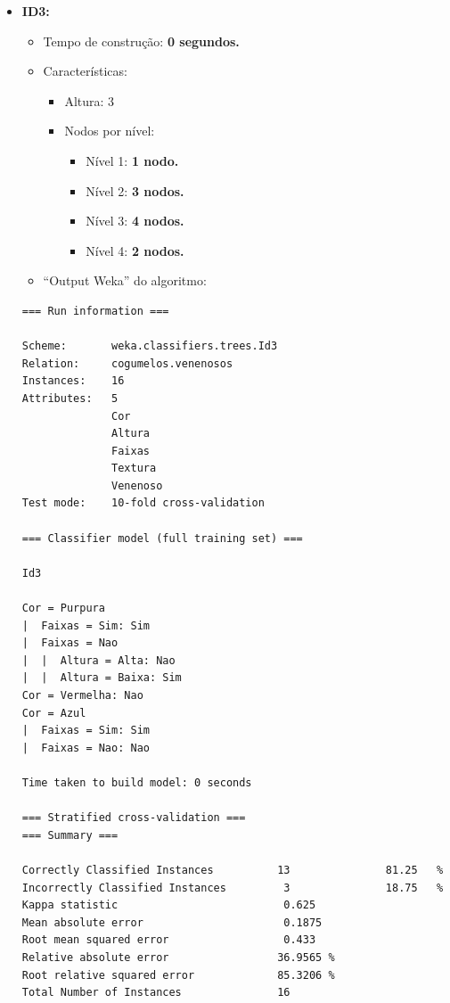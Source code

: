 \documentclass[
    article,            %
    11pt,               %
    oneside,            %
    a4paper,            %
    english,            %
    brazil,             %
    sumario=tradicional,
    ]{abntex2}
\begin{document}
\begin{itemize}
    \item \textbf{ID3:}
    \begin{itemize}
        \item Tempo de construção: \textbf{0 segundos.}
        \item Características:
        \begin{itemize}
            \item Altura: 3
            \item Nodos por nível:
                \begin{itemize}
                    \item Nível 1: \textbf{1 nodo.}
                    \item Nível 2: \textbf{3 nodos.}
                    \item Nível 3: \textbf{4 nodos.}
                    \item Nível 4: \textbf{2 nodos.}
                \end{itemize}
        \end{itemize}
        \item ``Output Weka'' do algoritmo:
    \end{itemize}   

\begin{Verbatim}[frame=single, fontsize=\tiny]
=== Run information ===

Scheme:       weka.classifiers.trees.Id3 
Relation:     cogumelos.venenosos
Instances:    16
Attributes:   5
              Cor
              Altura
              Faixas
              Textura
              Venenoso
Test mode:    10-fold cross-validation

=== Classifier model (full training set) ===

Id3

Cor = Purpura
|  Faixas = Sim: Sim
|  Faixas = Nao
|  |  Altura = Alta: Nao
|  |  Altura = Baixa: Sim
Cor = Vermelha: Nao
Cor = Azul
|  Faixas = Sim: Sim
|  Faixas = Nao: Nao

Time taken to build model: 0 seconds

=== Stratified cross-validation ===
=== Summary ===

Correctly Classified Instances          13               81.25   %
Incorrectly Classified Instances         3               18.75   %
Kappa statistic                          0.625 
Mean absolute error                      0.1875
Root mean squared error                  0.433 
Relative absolute error                 36.9565 %
Root relative squared error             85.3206 %
Total Number of Instances               16     


\end{Verbatim}
\end{itemize}
\end{document}
